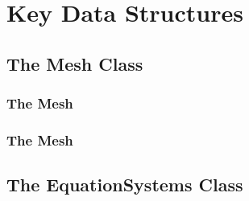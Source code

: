 \section{Key Data Structures}

\subsection{The Mesh Class}
\begin{frame}[shrink]
  \frametitle{The Mesh}  
  
\end{frame}


\begin{frame}[shrink]
  \frametitle{The Mesh}  
  
\end{frame}

\subsection{The EquationSystems Class}
\begin{frame}[shrink]
  
\end{frame}
